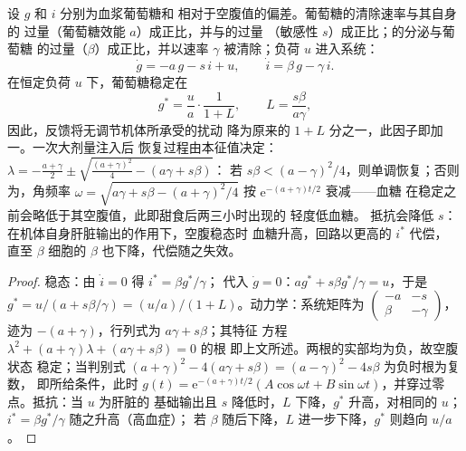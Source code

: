 \begin{theorem}\label{thm:b3:endocrinology:loop}
设 $g$ 和 $i$ 分别为血浆葡萄糖和
相对于空腹值的偏差。葡萄糖的清除速率与其自身的
过量（葡萄糖效能 $a$）成正比，并与的过量
（敏感性 $s$）成正比；的分泌与葡萄糖
的过量（$\beta$）成正比，并以速率 $\gamma$ 被清除；负荷 $u$ 进入系统：
\[
\dot g = -a\,g - s\,i + u, \qquad \dot i = \beta\,g - \gamma\,i .
\]
在恒定负荷 $u$ 下，葡萄糖稳定在
\[
g^{*} = \frac{u}{a}\cdot\frac{1}{1 + L}, \qquad L = \frac{s\beta}{a\gamma},
\]
因此，反馈将无调节机体所承受的扰动
降为原来的 $1 + L$ 分之一，此因子即\emph{}加一。一次大剂量注入后
恢复过程由本征值决定：
$\lambda = -\tfrac{a + \gamma}{2} \pm \sqrt{\tfrac{(a+\gamma)^{2}}{4} - (a\gamma + s\beta)}$：
若 $s\beta < (a - \gamma)^{2}/4$，则单调恢复；否则为，角频率 $\omega = \sqrt{a\gamma + s\beta -
(a+\gamma)^{2}/4}$ 按 $\mathrm{e}^{-(a+\gamma)t/2}$ 衰减——血糖
在稳定之前会略低于其空腹值，此即甜食后两三小时出现的
轻度低血糖。
抵抗会降低 $s$：在机体自身肝脏输出的作用下，空腹稳态时
血糖升高，回路以更高的 $i^{*}$ 代偿，
直至 $\beta$ 细胞的 $\beta$ 也下降，代偿随之失效。
\end{theorem}
\begin{proof}
稳态：由 $\dot i = 0$ 得 $i^{*} = \beta g^{*}/\gamma$；
代入 $\dot g = 0$：$a g^{*} + s\beta g^{*}/\gamma = u$，于是 $g^{*} =
u/(a + s\beta/\gamma) = (u/a)/(1 + L)$。动力学：系统矩阵为
$\begin{pmatrix} -a & -s\\ \beta & -\gamma\end{pmatrix}$，迹为
$-(a+\gamma)$，行列式为 $a\gamma + s\beta$；其特征
方程 $\lambda^{2} + (a+\gamma)\lambda + (a\gamma + s\beta) = 0$ 的根
即上文所述。两根的实部均为负，故空腹状态
稳定；当判别式 $(a+\gamma)^{2}
- 4(a\gamma + s\beta) = (a-\gamma)^{2} - 4s\beta$ 为负时根为复数，
即所给条件，此时 $g(t) = \mathrm{e}^{-(a+\gamma)t/2}(A\cos\omega t
+ B\sin\omega t)$，并穿过零点。抵抗：当 $u$ 为肝脏的
基础输出且 $s$ 降低时，$L$ 下降，$g^{*}$ 升高，对相同的
$u$；$i^{*} = \beta g^{*}/\gamma$ 随之升高（高血症）；
若 $\beta$ 随后下降，$L$ 进一步下降，$g^{*}$ 则趋向 $u/a$。
\end{proof}


